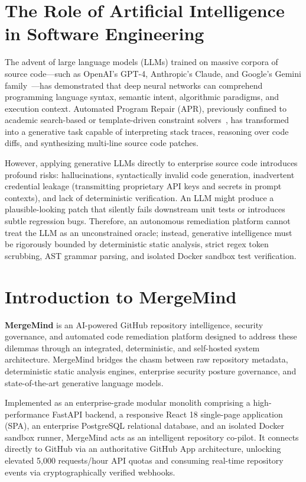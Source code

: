 \documentclass[12pt,a4paper,oneside]{report}
\begin{document}
\section{The Role of Artificial Intelligence in Software Engineering}
\label{sec:ai-in-se}

The advent of large language models (LLMs) trained on massive corpora of source code---such as OpenAI's GPT-4, Anthropic's Claude, and Google's Gemini family~\cite{deepmind2023gemini,chen2021evaluating}---has demonstrated that deep neural networks can comprehend programming language syntax, semantic intent, algorithmic paradigms, and execution context. Automated Program Repair (APR), previously confined to academic search-based or template-driven constraint solvers~\cite{legoues2019automated}, has transformed into a generative task capable of interpreting stack traces, reasoning over code diffs, and synthesizing multi-line source code patches.

However, applying generative LLMs directly to enterprise source code introduces profound risks: hallucinations, syntactically invalid code generation, inadvertent credential leakage (transmitting proprietary API keys and secrets in prompt contexts), and lack of deterministic verification. An LLM might produce a plausible-looking patch that silently fails downstream unit tests or introduces subtle regression bugs. Therefore, an autonomous remediation platform cannot treat the LLM as an unconstrained oracle; instead, generative intelligence must be rigorously bounded by deterministic static analysis, strict regex token scrubbing, AST grammar parsing, and isolated Docker sandbox test verification.

\section{Introduction to MergeMind}
\label{sec:intro-mergemind}

\textbf{MergeMind} is an AI-powered GitHub repository intelligence, security governance, and automated code remediation platform designed to address these dilemmas through an integrated, deterministic, and self-hosted system architecture. MergeMind bridges the chasm between raw repository metadata, deterministic static analysis engines, enterprise security posture governance, and state-of-the-art generative language models.

Implemented as an enterprise-grade modular monolith comprising a high-performance FastAPI backend, a responsive React 18 single-page application (SPA), an enterprise PostgreSQL relational database, and an isolated Docker sandbox runner, MergeMind acts as an intelligent repository co-pilot. It connects directly to GitHub via an authoritative GitHub App architecture, unlocking elevated 5,000 requests/hour API quotas and consuming real-time repository events via cryptographically verified webhooks.
\end{document}
